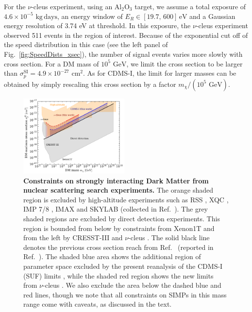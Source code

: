 \documentclass[prd,twocolumn,showpacs,nofootinbib,aps]{revtex4-1}
\begin{document}
For the $\nu$-cleus experiment, using an $\mathrm{Al}_2\mathrm{O}_3$ target, we assume a total exposure of $4.6 \times 10^{-5}\,\,\mathrm{kg} \,\mathrm{days}$, an energy window of $E_R \in [19.7, \, 600] \,\mathrm{eV}$ and a Gaussian energy resolution of 3.74 eV at threshold. In this exposure, the $\nu$-cleus experiment observed 511 events in the region of interest. Because of the exponential cut off of the speed distribution in this case (see the left panel of Fig.~\ref{fig:SpeedDists_xsec}), the number of signal events varies more slowly with cross section. For a DM mass of $10^5 \,\,\mathrm{GeV}$, we limit the cross section to be larger than $\sigma_p^\mathrm{SI} = 4.9 \times 10^{-27}\,\,\mathrm{cm}^2$. As for CDMS-I, the limit for larger masses can be obtained by simply rescaling this cross section by a factor $m_\chi/(10^5\,\,\mathrm{GeV})$.


\begin{figure}[t]
\centering
\includegraphics[width=0.49\textwidth,]{plots/Constraints1.pdf}
\caption{\textbf{Constraints on strongly interacting Dark Matter from nuclear scattering search experiments.} The orange shaded region is excluded by high-altitude experiments such as RSS \cite{Rich1987}, XQC \cite{Zaharijas:2004jv,Erickcek:2007jv}, IMP 7/8 \cite{SnowdenIfft1990}, IMAX \cite{McGuire:1994pq} and SKYLAB \cite{Shirk1978} (collected in Ref.~\cite{Mack:2007xj}). The grey shaded regions are excluded by direct detection experiments. This region is bounded from below by constraints from Xenon1T \cite{Aprile:2017iyp} and from the left by CRESST-III \cite{Petricca:2017zdp} and $\nu$-cleus \cite{Angloher:2017sxg,Davis:2017noy}. The solid black line denotes the previous cross section reach from Ref.~\cite{Albuquerque:2003ei} (reported in Ref.~\cite{Mack:2007xj}). The shaded blue area shows the additional region of parameter space excluded by the present reanalysis of the CDMS-I (SUF) limits \cite{Abusaidi:2000wg,Abrams:2002nb}, while the shaded red region shows the new limits from $\nu$-cleus \cite{Angloher:2017sxg}. We also exclude the area below the dashed blue and red lines, though we note that all constraints on SIMPs in this mass range come with caveats, as discussed in the text.}
\label{fig:constraints}
\end{figure}
\end{document}

